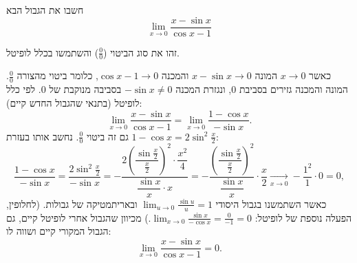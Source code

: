 
\begin{question}
חשבו את הגבול הבא
\[ \lim_{x\to 0} \frac{x - \sin x}{\cos x - 1} \]
\end{question}

\begin{hint}
זהו את סוג הביטוי ($\frac{0}{0}$) והשתמשו בכלל לופיטל.
\end{hint}

\begin{solution}
כאשר $x \to 0$ המונה $x - \sin x \to 0$ והמכנה $\cos x - 1 \to 0$, כלומר ביטוי מהצורה $\frac{0}{0}$.
המונה והמכנה גזירים בסביבת $0$, ונגזרת המכנה $-\sin x \ne 0$ בסביבה מנוקבת של $0$. לפי כלל לופיטל (בתנאי שהגבול החדש קיים):
\[ \lim_{x\to 0} \frac{x - \sin x}{\cos x - 1} = \lim_{x\to 0} \frac{1 - \cos x}{-\sin x}. \]
גם זה ביטוי $\frac{0}{0}$. נחשב אותו בעזרת $1 - \cos x = 2\sin^2\frac{x}{2}$:
\[ \frac{1 - \cos x}{-\sin x} = \frac{2\sin^2\frac{x}{2}}{-\sin x}
   = -\frac{2\left(\dfrac{\sin\frac{x}{2}}{\frac{x}{2}}\right)^2 \cdot \dfrac{x^2}{4}}{\dfrac{\sin x}{x} \cdot x}
   = -\frac{\left(\dfrac{\sin\frac{x}{2}}{\frac{x}{2}}\right)^2}{\dfrac{\sin x}{x}} \cdot \frac{x}{2}
   \xrightarrow[x\to 0]{} -\frac{1^2}{1}\cdot 0 = 0, \]
כאשר השתמשנו בגבול היסודי $\lim_{u\to 0}\frac{\sin u}{u} = 1$ ובאריתמטיקה של גבולות.
(לחלופין, הפעלה נוספת של לופיטל: $\lim_{x\to0}\frac{\sin x}{-\cos x} = \frac{0}{-1} = 0$.)
מכיוון שהגבול אחרי לופיטל קיים, גם הגבול המקורי קיים ושווה לו:
\[ \boxed{\lim_{x\to 0} \frac{x - \sin x}{\cos x - 1} = 0}. \]
\end{solution}
